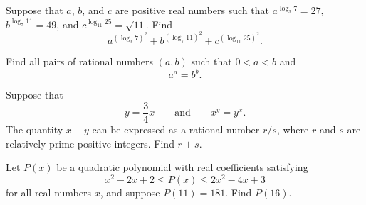 \documentclass[11pt]{article}
\theoremstyle{definition}
\begin{document}
\begin{question}[name={2009 AIME II, \href{https://artofproblemsolving.com/community/c4p1455401}{Problem 2}}]
	Suppose that $ a$, $ b$, and $ c$ are positive real numbers such that $ a^{\log_3 7} = 27$, $ b^{\log_7 11} = 49$, and $ c^{\log_{11} 25} = \sqrt {11}$. Find
	\[ a^{(\log_3 7)^2} + b^{(\log_7 11)^2} + c^{(\log_{11} 25)^2}.
	\]
\end{question}


%	










\begin{question}[name={2020 USAMTS, Year 32, Round 1, \href{https://artofproblemsolving.com/community/c123h2314081p18414057}{Problem 5}}]
	Find all pairs of rational numbers $(a, b)$ such that $0 < a < b$ and $$a^a = b^b.$$
\end{question}


%	













\begin{question}[name={2010 AIME I, \href{https://artofproblemsolving.com/community/c4p1813828}{Problem 3}}]
	Suppose that $$ y = \frac34x \qquad \text{and} \qquad x^y = y^x.$$ The quantity $ x + y$ can be expressed as a rational number ${r}/{s}$, where $ r$ and $ s$ are relatively prime positive integers. Find $ r + s$.	
\end{question}


%	












\begin{question}[name={2010 AIME I, \href{https://artofproblemsolving.com/community/c4p1813817}{Problem 6}}]
	Let $ P(x)$ be a quadratic polynomial with real coefficients satisfying\[x^2 - 2x + 2 \le P(x) \le 2x^2 - 4x + 3\]for all real numbers $ x$, and suppose $ P(11) = 181$. Find $ P(16)$.
\end{question}
\end{document}
